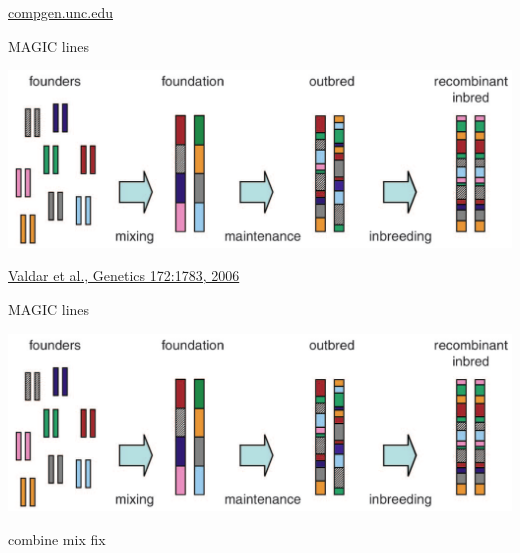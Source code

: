 \documentclass[12pt]{article}
\newcommand{\citesize}{\fontsize{14}{18} \selectfont}
\newcommand{\headsize}{\fontsize{35}{35} \selectfont}
\newcommand{\smallsize}{\fontsize{25}{30} \selectfont}
\begin{document}
\vfill

\hfill {\citesize \color{citecolor} \href{http://compgen.unc.edu/wp/?page_id=99}{compgen.unc.edu}

\vspace*{5mm}


\newpage

\headsize \color{myyellow}
\hfill \begin{minipage}{5.75in}
\centering
MAGIC lines
\end{minipage}

\vspace{20mm}

\centerline{\includegraphics[width=10in]{Figs/valdar_genet2006.png}}

\vfill

\hfill {\citesize \color{citecolor} \href{http://www.genetics.org/content/172/3/1783.full}{Valdar et al., Genetics 172:1783, 2006}}

\vspace*{5mm}


\newpage

\addtocounter{page}{-1}

\headsize \color{myyellow}
\hfill \begin{minipage}{5.75in}
\centering
MAGIC lines
\end{minipage}

\vspace{20mm}

\centerline{\includegraphics[width=10in]{Figs/valdar_genet2006.png}}

\smallsize \color{myyellow}
\hspace*{52mm} combine \hspace*{35mm} mix \hspace*{52mm} fix

}
\end{document}
